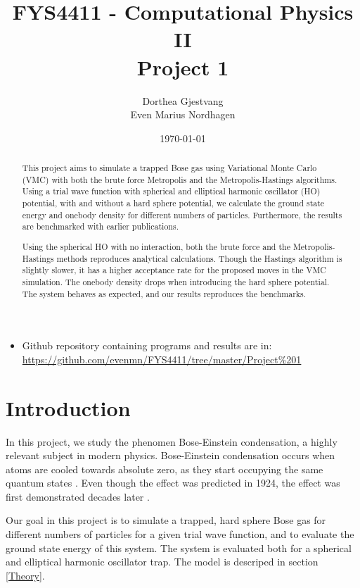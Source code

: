 \documentclass[norsk,a4paper,12pt]{article}
\title{FYS4411 - Computational Physics II\\\vspace{2mm} \Large{Project 1}}
\author{\large Dorthea Gjestvang\\ Even Marius Nordhagen}
\date\today
\begin{document}
\maketitle
\begin{abstract}
This project aims to simulate a trapped Bose gas using Variational Monte Carlo (VMC) with both the  brute force Metropolis and the Metropolis-Hastings algorithms. Using a trial wave function with spherical and elliptical harmonic oscillator (HO) potential, with and without a hard sphere potential, we calculate the ground state energy and onebody density for different numbers of particles. Furthermore, the results are benchmarked with earlier publications. \par 

Using the spherical HO with no interaction, both the brute force and the Metropolis-Hastings methods reproduces analytical calculations. Though the Hastings algorithm is slightly slower, it has a higher acceptance rate for the proposed moves in the VMC simulation. The onebody density drops when introducing the hard sphere potential. The system behaves as expected, and our results reproduces the benchmarks.
\par 

\end{abstract}


\begin{itemize}
\item Github repository containing programs and results are in: \url{https://github.com/evenmn/FYS4411/tree/master/Project%201}
\end{itemize}


\section{Introduction}

In this project, we study the  phenomen Bose-Einstein condensation, a highly relevant subject in modern physics.  Bose-Einstein condensation occurs when atoms are cooled towards absolute zero, as they start occupying the same quantum states \cite{JE2016}. Even though the effect was predicted in 1924, the effect was first demonstrated decades later \cite{SP}.

Our goal in this project is to simulate a trapped, hard sphere Bose gas for different numbers of particles for a given trial wave function, and to evaluate the ground state energy of this system. The system is evaluated both for a spherical and elliptical harmonic oscillator trap. The model is descriped in section \ref{Theory}. \par
\end{document}

